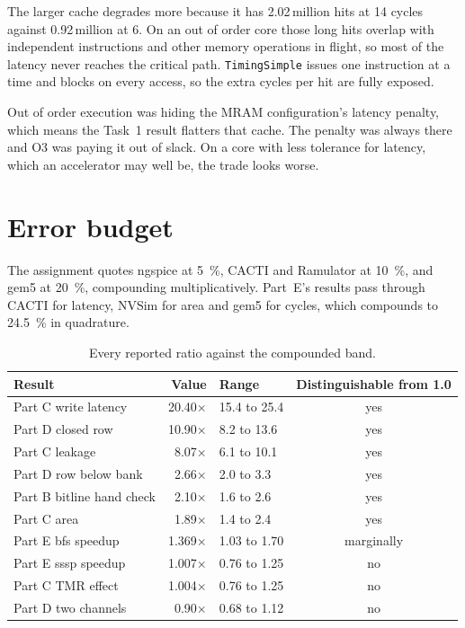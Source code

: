 \documentclass[9pt,a4paper]{extarticle}
\begin{document}
The larger cache degrades more because it has 2.02\,million hits at 14
cycles against 0.92\,million at 6. On an out of order core those long hits
overlap with independent instructions and other memory operations in
flight, so most of the latency never reaches the critical path.
\texttt{TimingSimple} issues one instruction at a time and blocks on every
access, so the extra cycles per hit are fully exposed.

Out of order execution was hiding the MRAM configuration's latency
penalty, which means the Task~1 result flatters that cache. The penalty
was always there and O3 was paying it out of slack. On a core with less
tolerance for latency, which an accelerator may well be, the trade looks
worse.





\section{Error budget}
\label{sec:err}

The assignment quotes ngspice at \SI{5}{\percent}, CACTI and Ramulator at
\SI{10}{\percent}, and gem5 at \SI{20}{\percent}, compounding
multiplicatively. Part~E's results pass through CACTI for latency, NVSim
for area and gem5 for cycles, which compounds to \SI{24.5}{\percent} in
quadrature.

\begin{table}[!ht]\centering\small
\caption{Every reported ratio against the compounded band.}
\label{tab:err}
\begin{tabular}{|l|r|l|c|}
\hline
Result & Value & Range & Distinguishable from 1.0 \\
\hline
Part C write latency & 20.40$\times$ & 15.4 to 25.4 & yes \\
\hline
Part D closed row & 10.90$\times$ & 8.2 to 13.6 & yes \\
\hline
Part C leakage & 8.07$\times$ & 6.1 to 10.1 & yes \\
\hline
Part D row below bank & 2.66$\times$ & 2.0 to 3.3 & yes \\
\hline
Part B bitline hand check & 2.10$\times$ & 1.6 to 2.6 & yes \\
\hline
Part C area & 1.89$\times$ & 1.4 to 2.4 & yes \\
\hline
Part E bfs speedup & 1.369$\times$ & 1.03 to 1.70 & marginally \\
\hline
Part E sssp speedup & 1.007$\times$ & 0.76 to 1.25 & no \\
\hline
Part C TMR effect & 1.004$\times$ & 0.76 to 1.25 & no \\
\hline
Part D two channels & 0.90$\times$ & 0.68 to 1.12 & no \\
\hline
\end{tabular}
\end{table}
\end{document}
